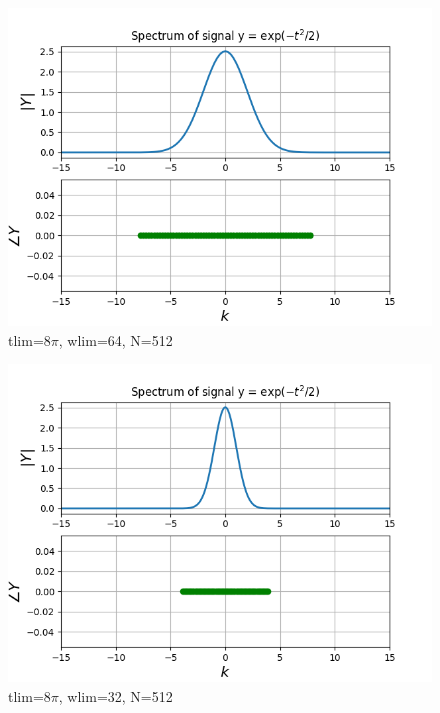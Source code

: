 \documentclass[11pt, a4paper]{article}
\begin{document}
\begin{figure}[!tbh]
   	\centering
  \includegraphics[scale=0.5]{a8_10.png} 
    \caption{tlim=8$\pi$, wlim=64, N=512} 	
   \end{figure} 
   
   
\begin{figure}[!tbh]
   	\centering
  \includegraphics[scale=0.5]{a8_11.png} 
    \caption{tlim=8$\pi$, wlim=32, N=512} 	
   \end{figure} 
   
\end{document}
